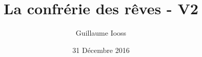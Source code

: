 



\newcommand{\forplayer}{n} %
\newcommand{\theplayer}{1} %
\newcommand{\manyColored}{n}




\newcommand{\pageForPlayer}[4]{%
\player{#1}{
	\section{Il était une fois... ton personnage~: #2}
	\begin{description}
		#3
	\end{description}
\par
	\paragraph{Description du personnage.}
	{#4}
}}


\title{La confrérie des rêves - V2}
\author{Guillaume Iooss}
\date{31 Décembre 2016}



\mj{\maketitle}



